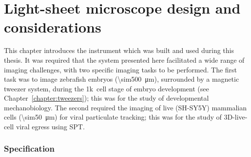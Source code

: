 

\ifpdf
    \graphicspath{{Chapters/design/Figs/Raster/}{Chapters/design/Figs/PDF/}{Chapters/design/Figs/}}
\else
    \graphicspath{{Chapters/design/Figs/Vector/}{Chapters/design/Figs/}}
\fi



\chapter{Light-sheet microscope design and considerations }\label{chapter:design}


This chapter introduces the instrument which was built and used during this thesis.
It was required that the system presented here facilitated a wide range of imaging challenges, with two specific %
imaging tasks to be performed.
The first %
task was to image \gls{zebrafish} embryos (\SI{\sim500}{\micro\meter}), surrounded by a magnetic tweezer system, during the \SI{1}{}k~cell stage of embryo development (see Chapter~\ref{chapter:tweezers}); this was for the study of developmental mechanobiology.
The second required the imaging of live (\gls{SH-SY5Y}) mammalian cells (\SI{\sim50}{\micro\meter}) for viral particulate tracking; this was for the study of 3D-live-cell viral egress using \gls{SPT}.
\pagebreak
\subsection*{Specification}\label{sec:specification}

